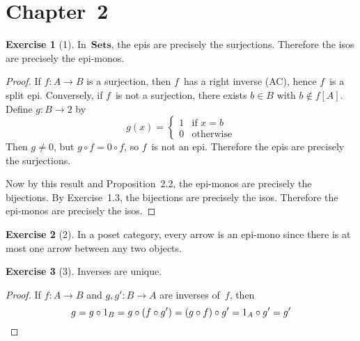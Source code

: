 \documentclass[letterpaper,12pt]{article}
\newcommand{\after}{\circ}
\newcommand{\cat}[1]{\mathbf{#1}}
\newcommand{\Sets}{\cat{Sets}}
\theoremstyle{definition}
\newtheorem*{exer}{Exercise}
\theoremstyle{remark}
\theoremstyle{direction}
\begin{document}
\section*{Chapter~2}
\begin{exer}[1]
In~\(\Sets\), the epis are precisely the surjections. Therefore the isos are precisely the epi-monos.
\end{exer}
\begin{proof}
If \(f:A\to B\) is a surjection, then \(f\)~has a right inverse (AC), hence \(f\)~is a split epi. Conversely, if \(f\)~is not a surjection, there exists \(b\in B\) with \(b\not\in f[A]\). Define \(g:B\to 2\) by
\[g(x)=\begin{cases}
1&\text{if }x=b\\
0&\text{otherwise}
\end{cases}\]
Then \(g\ne0\), but \(g\after f=0\after f\), so \(f\)~is not an epi. Therefore the epis are precisely the surjections.

Now by this result and Proposition~2.2, the epi-monos are precisely the bijections. By Exercise~1.3, the bijections are precisely the isos. Therefore the epi-monos are precisely the isos.
\end{proof}

\begin{exer}[2]
In a poset category, every arrow is an epi-mono since there is at most one arrow between any two objects.
\end{exer}

\begin{exer}[3]
Inverses are unique.
\end{exer}
\begin{proof}
If \(f:A\to B\) and \(g,g':B\to A\) are inverses of~\(f\), then
\[g=g\after 1_B=g\after(f\after g')=(g\after f)\after g'=1_A\after g'=g'\qedhere\]
\end{proof}
\end{document}
